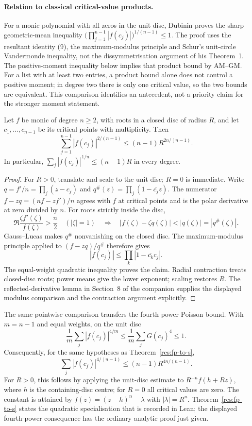 \documentclass[11pt]{article}
\begin{document}
\paragraph{Relation to classical critical-value products.}
For a monic polynomial with all zeros in the unit disc, Dubinin
\cite[Theorem~2 and its proof, pp.~1172--1173]{dubinin2006critical}
proves the sharp geometric-mean inequality
$\bigl(\prod_{j=1}^{n-1}|f(c_j)|\bigr)^{1/(n-1)}\le1$.
The proof uses the resultant identity (9), the maximum-modulus principle
and Schur's unit-circle Vandermonde inequality, not the dissymmetrisation
argument of his Theorem~1. The positive-moment inequality below implies
that product bound by AM--GM. For a list with at least two entries, a
product bound alone does not control a positive moment; in degree two
there is only one critical value, so the two bounds are equivalent.
This comparison identifies an antecedent, not a priority claim for the
stronger moment statement.

\begin{theorem}\label{res:fp-to-s}
Let $f$ be monic of degree $n\ge2$, with roots in a closed disc of radius
$R$, and let $c_1,\ldots,c_{n-1}$ be its critical points with multiplicity.
Then
\[
 \sum_{j=1}^{n-1}|f(c_j)|^{2/(n-1)}
 \le(n-1)R^{2n/(n-1)}.
\]
In particular, $\sum_j|f(c_j)|^{1/n}\le(n-1)R$ in every degree.
\end{theorem}

\begin{proof}
For $R>0$, translate and scale to the unit disc; $R=0$ is immediate.
Write $q=f'/n=\prod_j(z-c_j)$ and
$q^\#(z)=\prod_j(1-\overline{c_j}z)$. The numerator
$f-zq=(nf-zf')/n$ agrees with $f$ at critical points and is the polar
derivative at zero divided by $n$. For roots strictly inside the disc,
\[
 \Re\frac{\zeta f'(\zeta)}{f(\zeta)}>\frac n2
 \quad(|\zeta|=1)
 \quad\Longrightarrow\quad
 |f(\zeta)-\zeta q(\zeta)|<|q(\zeta)|=|q^\#(\zeta)|.
\]
Gauss--Lucas makes $q^\#$ nonvanishing on the closed disc. The
maximum-modulus principle applied to $(f-zq)/q^\#$ therefore gives
\[
 |f(c_j)|\le\prod_k|1-\overline{c_k}c_j|.
\]
The equal-weight quadratic inequality proves the claim. Radial
contraction treats closed-disc roots; power means give the lower
exponent; scaling restores $R$. The reflected-derivative lemma in
Section~8 of the companion supplies the displayed modulus comparison
and the contraction argument explicitly.
\end{proof}

The same pointwise comparison transfers the fourth-power Poisson bound.
With $m=n-1$ and equal weights, on the unit disc
\[
 \frac1m\sum_j|f(c_j)|^{4/m}
 \le\frac1m\sum_jG(c_j)^4\le1.
\]
Consequently, for the same hypotheses as Theorem~\ref{res:fp-to-s},
\[
 \sum_j|f(c_j)|^{4/(n-1)}\le(n-1)R^{4n/(n-1)}.
\]
For $R>0$, this follows by applying the unit-disc estimate to
$R^{-n}f(h+Rz)$, where $h$ is the containing-disc centre; for $R=0$
all critical values are zero. The constant is attained by
$f(z)=(z-h)^n-\lambda$ with $|\lambda|=R^n$.
Theorem~\ref{res:fp-to-s} states the quadratic specialisation that is
recorded in Lean; the displayed fourth-power consequence has the ordinary
analytic proof just given.
\end{document}
